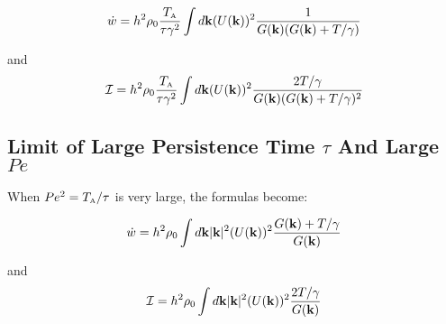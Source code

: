 \documentclass[amsmath,preprintnumbers,10pt,article,notitlepage]{revtex4-1}
\newcommand{\A}{\text{\tiny{A}}}
\begin{document}
\begin{equation}\label{eq:final_expression_work_large_tau_small_Pe}
\dot{w}  = h^2 \rho_0 \dfrac{T_\A}{\tau \gamma^2} \int d{\bf k} (U({\bf k}))^2 \dfrac{1}{G({\bf k}) (G({\bf k}) + T/ \gamma)} 
\end{equation}

and
\begin{equation}\label{eq:final_expression_I_large_tau_small_Pe}
 \mathcal{I}  =  h^2 \rho_0 \frac{T_\A}{\tau \gamma^2 }   \int d{\bf k}  (U({\bf k}))^2 \dfrac{ 2T/\gamma}{G({\bf k}) (G({\bf k}) + T/ \gamma)^2} 
 \end{equation}

\subsection{Limit of Large Persistence Time $\tau$ And Large $Pe$}


When $Pe^2 = T_\A/\tau$ is very large, the formulas become:


\begin{equation}\label{eq:final_expression_work_large_tau_large_Pe}
\dot{w}  = h^2 \rho_0 \int d{\bf k}  |{\bf k}|^2 (U({\bf k}))^2  \dfrac{G({\bf k})+T/\gamma}{G({\bf k})}
\end{equation}

and
\begin{equation}\label{eq:final_expression_I_large_tau_large_Pe}
  \mathcal{I} = h^2 \rho_0 \int d{\bf k}  |{\bf k}|^2 (U({\bf k}))^2  \dfrac{2T/\gamma}{G({\bf k})}
\end{equation}
\end{document}
